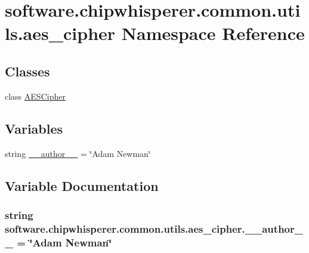 \hypertarget{namespacesoftware_1_1chipwhisperer_1_1common_1_1utils_1_1aes__cipher}{}\section{software.\+chipwhisperer.\+common.\+utils.\+aes\+\_\+cipher Namespace Reference}
\label{namespacesoftware_1_1chipwhisperer_1_1common_1_1utils_1_1aes__cipher}
\subsection*{Classes}
\begin{DoxyCompactItemize}
\item 
class \hyperlink{classsoftware_1_1chipwhisperer_1_1common_1_1utils_1_1aes__cipher_1_1AESCipher}{A\+E\+S\+Cipher}
\end{DoxyCompactItemize}
\subsection*{Variables}
\begin{DoxyCompactItemize}
\item 
string \hyperlink{namespacesoftware_1_1chipwhisperer_1_1common_1_1utils_1_1aes__cipher_a3798893cf7c163b80ca3f9fad8a5d6d0}{\+\_\+\+\_\+author\+\_\+\+\_\+} = \char`\"{}Adam Newman\char`\"{}
\end{DoxyCompactItemize}


\subsection{Variable Documentation}
\hypertarget{namespacesoftware_1_1chipwhisperer_1_1common_1_1utils_1_1aes__cipher_a3798893cf7c163b80ca3f9fad8a5d6d0}{}
\subsubsection[{\+\_\+\+\_\+author\+\_\+\+\_\+}]{\setlength{\rightskip}{0pt plus 5cm}string software.\+chipwhisperer.\+common.\+utils.\+aes\+\_\+cipher.\+\_\+\+\_\+author\+\_\+\+\_\+ = \char`\"{}Adam Newman\char`\"{}}\label{namespacesoftware_1_1chipwhisperer_1_1common_1_1utils_1_1aes__cipher_a3798893cf7c163b80ca3f9fad8a5d6d0}
